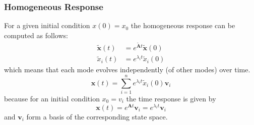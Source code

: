 \subsubsection{Homogeneous Response}
For a given initial condition $x(0)=x_0$ the homogeneous response can be computed as follows:\\
\begin{align*}
    \tilde{\mathbf{x}}(t) & =e^{\tilde{\mathbf{A}}t}\tilde{\mathbf{x}}(0) \\
    \tilde{x}_i(t)        & =e^{\lambda_{i}t}\tilde{x}_i(0)
\end{align*}
which means that each mode evolves independently (of other modes) over time.\\
\begin{equation*}
    \mathbf{x}(t)=\sum_{i=1}^{n}e^{\lambda_{i}t}\tilde{x}_i(0)\mathbf{v}_i
\end{equation*}
because for an initial condition $x_0 = v_i$ the time response is given by
\begin{equation*}
    \mathbf{x}(t)=e^{\mathbf{A}t}\mathbf{v}_i=e^{\lambda_{i}t}\mathbf{v}_i
\end{equation*}
and $\mathbf{v}_i$ form a basis of the corresponding state space.

